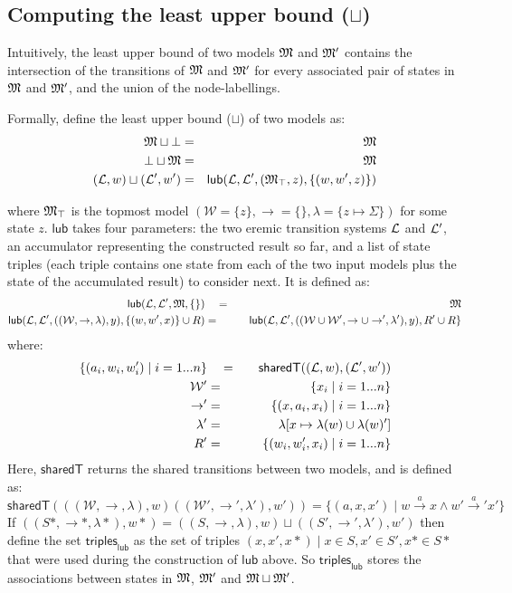 \subsection{Computing the least upper bound ($\sqcup$)}

\NI Intuitively, the least upper bound of two models $\frak{M}$ and
$\frak{M}'$ contains the intersection of the transitions of $\frak{M}$ and
$\frak{M}'$ for every associated pair of states in $\frak{M}$ and $\frak{M}'$, and
the union of the node-labellings.

Formally, define the least upper bound ($\sqcup$) of two models as:
\begin{eqnarray*}
\frak{M} \sqcup \bot & = & \frak{M} \\
\bot \sqcup \frak{M} & = & \frak{M} \\
(\mathcal{L},w) \sqcup (\mathcal{L}',w') & = & \mathsf{lub}(\mathcal{L}, \mathcal{L}', (\frak{M}_\top, z), \{(w, w', z)\})
\end{eqnarray*}

\NI where $\frak{M}_\top$ is the topmost model $(\mathcal{W}=\{z\},
\rightarrow=\{\}, \lambda=\{z \mapsto \Sigma\})$ for some state $z$.
$\mathsf{lub}$ takes four parameters: the two eremic transition
systems $\mathcal{L}$ and $\mathcal{L}'$, an accumulator representing the
constructed result so far, and a list of state triples (each triple
contains one state from each of the two input models plus the state of
the accumulated result) to consider next.  It is defined as:
\begin{eqnarray*}
  \mathsf{lub}(\mathcal{L}, \mathcal{L}', \frak{M}, \{\}) 
     &\quad =\quad & 
  \frak{M} \\
  \mathsf{lub}(\mathcal{L}, \mathcal{L}', ((\mathcal{W}, \rightarrow, \lambda), y), \{(w,w',x)\} \cup R) 
     & = & 
  \mathsf{lub}(\mathcal{L}, \mathcal{L}', ((\mathcal{W} \cup \mathcal{W}', \rightarrow \cup \rightarrow', \lambda'), y), R' \cup R\}
\end{eqnarray*}
where:
\begin{eqnarray*}
  \{(a_i, w_i, w'_i) \;|\; i = 1 ... n\} 
     &\quad =\quad & 
  \mathsf{sharedT}((\mathcal{L},w), (\mathcal{L}',w')) \\
  \mathcal{W}' 
     & = & 
  \{x_i \;|\; i = 1 ... n\} \\
  \rightarrow' 
     & = & 
  \{(x, a_i, x_i) \;|\; i = 1 ... n\} \\
  \lambda' 
     & = & 
  \lambda [x \mapsto \lambda(w) \cup \lambda(w)'] \\
  R' 
     & = & 
  \{(w_i, w'_i, x_i) \;|\; i = 1 ... n\}
\end{eqnarray*}
Here, $\mathsf{sharedT}$ returns the shared transitions between two models, and is defined as:
\[
\mathsf{sharedT}(((\mathcal{W}, \rightarrow, \lambda),w) ((\mathcal{W}', \rightarrow', \lambda'),w')) =  \{(a, x, x') \;|\; w \xrightarrow{a} x \land w' \xrightarrow{a}' x'\}
\]
If $((S*,\rightarrow*,\lambda*),w*) = ((S,\rightarrow,\lambda),w) \sqcup ((S',\rightarrow',\lambda'),w')$ then define
the set $\mathsf{triples}_\mathsf{lub}$ as the set of triples $(x,x',x*) \; | \; x \in S, x' \in S', x* \in S*$ that were used during the construction of $\mathsf{lub}$ above. So $\mathsf{triples}_\mathsf{lub}$ stores the associations between states in $\frak{M}$, $\frak{M}'$ and $\frak{M} \sqcup \frak{M}'$. 

